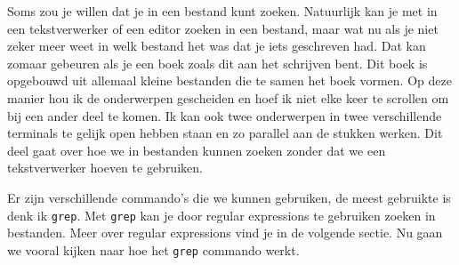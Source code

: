 
Soms zou je willen dat je in een bestand kunt zoeken. Natuurlijk kan je met in een tekstverwerker of een editor zoeken in een bestand, maar wat nu als je niet zeker meer weet in welk bestand het was dat je iets geschreven had. Dat kan zomaar gebeuren als je een boek zoals dit aan het schrijven bent. Dit boek is opgebouwd uit allemaal kleine bestanden die te samen het boek vormen. Op deze manier hou ik de onderwerpen gescheiden en hoef ik niet elke keer te scrollen om bij een ander deel te komen. Ik kan ook twee onderwerpen in twee verschillende terminals te gelijk open hebben staan en zo parallel aan de stukken werken. Dit deel gaat over hoe we in bestanden kunnen zoeken zonder dat we een tekstverwerker hoeven te gebruiken.

Er zijn verschillende commando's die we kunnen gebruiken, de meest gebruikte is denk ik \texttt{grep}. Met \texttt{grep} kan je door regular expressions te gebruiken zoeken in bestanden. Meer over regular expressions vind je in de volgende sectie. Nu gaan we vooral kijken naar hoe het \texttt{grep} commando werkt.


